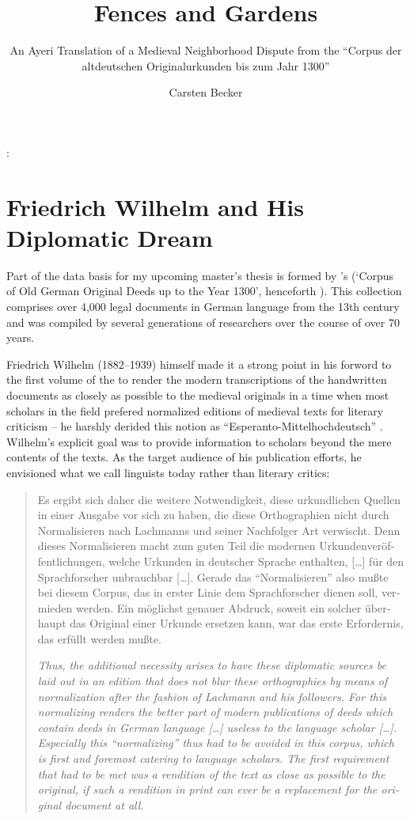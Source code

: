 \documentclass[12pt,paper=a4]{scrartcl}
\author{Carsten Becker}
\title{Fences and Gardens}
\subtitle{An Ayeri Translation of a Medieval Neighborhood Dispute from the \enquote{Corpus der altdeutschen Originalurkunden bis zum Jahr 1300}}
\newenvironment{mytitle}{
    \hfill
    \begin{minipage}{0.667\textwidth}
	\vspace{\baselineskip}
	\begin{center}
	    \Large
	    \sffamily\bfseries
	    \makeatletter
}{
	    \makeatother
	\end{center}
	\vspace{1em}
    \end{minipage}
    \hfill
}
\begin{document}

\begin{mytitle}
    \@title: \@subtitle
\end{mytitle}

\section{Friedrich Wilhelm and His Diplomatic Dream}
Part of the data basis for my upcoming master's thesis is formed by \citeauthor{CAO}'s  (\enquote*{Corpus of Old German Original Deeds up to the Year 1300}, henceforth ). This collection comprises over 4,000 legal documents in German language from the 13th century and was compiled by several generations of researchers over the course of over 70 years.

Friedrich Wilhelm (1882–1939) himself made it a strong point in his forword to the first volume of the  to render the modern transcriptions of the handwritten documents as closely as possible to the medieval originals in a time when most scholars in the field prefered normalized editions of medieval texts for literary criticism – he harshly derided this notion as \enquote{Esperanto-Mittelhochdeutsch} \autocite[see][VIII--IX]{CAO1}. Wilhelm's explicit goal was to provide information to scholars beyond the mere contents of the texts. As the target audience of his publication efforts, he envisioned what we call linguists today rather than literary critics:

\foreignblockquote{german}{\begin{multicols}{2}Es ergibt sich daher die weitere Notwendigkeit, diese urkundlichen Quellen in einer Ausgabe vor sich zu haben, die diese Orthographien nicht durch Normalisieren nach Lachmanns und seiner Nachfolger Art verwischt. Denn dieses Normalisieren macht zum guten Teil die modernen Urkundenveröffentlichungen, welche Urkunden in deutscher Sprache enthalten, […] für den Sprachforscher unbrauchbar […]. Gerade das \enquote{Normalisieren} also mußte bei diesem Corpus, das in erster Linie dem Sprachforscher dienen soll, vermieden werden. Ein möglichst genauer Abdruck, soweit ein solcher überhaupt das Original einer Urkunde ersetzen kann, war das erste Erfordernis, das erfüllt werden mußte. \autocite[LX]{CAO1}

\columnbreak

{\itshape Thus, the additional necessity arises to have these diplomatic sources be laid out in an edition that does not blur these orthographies by means of normalization after the fashion of Lachmann and his followers. For this normalizing renders the better part of modern publications of deeds which contain deeds in German language […] useless to the language scholar […]. Especially this \enquote{normalizing} thus had to be avoided in this corpus, which is first and foremost catering to language scholars. The first requirement that had to be met was a rendition of the text as close as possible to the original, if such a rendition in print can ever be a replacement for the original document at all.}\end{multicols}}
\end{document}
